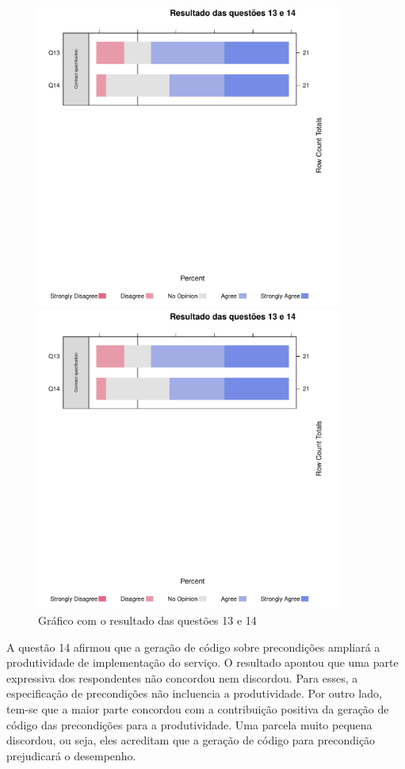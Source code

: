 \begin{figure}[!htb]
\centering
\includegraphics[width=100mm,trim = 6mm 115mm 6mm 
10mm,clip]{img/GraficoResultadoQuestoes13e14.pdf}

\includegraphics[width=100mm,trim = 6mm 0mm 6mm 
170mm,clip]{img/GraficoResultadoQuestoes13e14.pdf}

\caption{Gráfico com o resultado das questões 13 e 14}
\label{Respostas13e14}
\end{figure}

A questão 14 afirmou que a geração de código sobre precondições ampliará a
produtividade de implementação do serviço. O resultado apontou que uma parte
expressiva dos respondentes não concordou nem discordou. Para esses, a
especificação de precondições não incluencia a produtividade.
Por outro lado, tem-se que a maior parte concordou com a contribuição positiva
da geração de código das precondições para a produtividade. Uma parcela muito pequena discordou, ou seja,
eles acreditam que a geração de código para precondição prejudicará o
desempenho.

